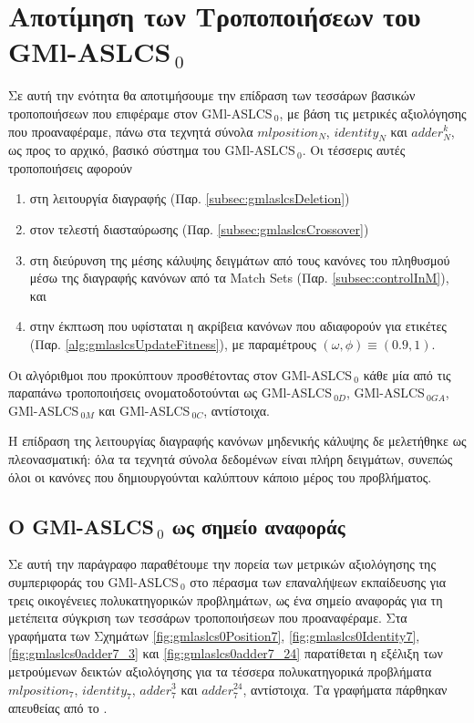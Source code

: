 \section{Αποτίμηση των Τροποποιήσεων του GMl-ASLCS$_{\:0}$}
Σε αυτή την ενότητα θα αποτιμήσουμε την επίδραση των τεσσάρων βασικών τροποποιήσεων που επιφέραμε στον GMl-ASLCS$_{\:0}$, με βάση τις μετρικές αξιολόγησης που προαναφέραμε, πάνω στα τεχνητά σύνολα $mlposition_{N}$, $identity_{N}$ και $adder^{k}_{N}$, ως προς το αρχικό, βασικό σύστημα του GMl-ASLCS$_{\:0}$. Οι τέσσερις αυτές τροποποιήσεις αφορούν 
\begin{enumerate}
\item στη λειτουργία διαγραφής (Παρ. \ref{subsec:gmlaslcsDeletion})
\item στον τελεστή διασταύρωσης (Παρ. \ref{subsec:gmlaslcsCrossover})
\item στη διεύρυνση της μέσης κάλυψης δειγμάτων από τους κανόνες του πληθυσμού μέσω της διαγραφής κανόνων από τα Match Sets (Παρ. \ref{subsec:controlInM}), και
\item στην έκπτωση που υφίσταται η ακρίβεια κανόνων που αδιαφορούν για ετικέτες (Παρ. \ref{alg:gmlaslcsUpdateFitness}), με παραμέτρους $(\omega, \phi) \equiv (0.9, 1)$.
\end{enumerate}

Οι αλγόριθμοι που προκύπτουν προσθέτοντας στον GMl-ASLCS$_{\:0}$ κάθε μία από τις παραπάνω τροποποιήσεις ονοματοδοτούνται ως GMl-ASLCS$_{\:0D}$, GMl-ASLCS$_{\:0GA}$, GMl-ASLCS$_{\:0M}$ και GMl-ASLCS$_{\:0C}$, αντίστοιχα. 

Η επίδραση της λειτουργίας διαγραφής κανόνων μηδενικής κάλυψης δε μελετήθηκε ως πλεονασματική: όλα τα τεχνητά σύνολα δεδομένων είναι πλήρη δειγμάτων, συνεπώς όλοι οι κανόνες που δημιουργούνται καλύπτουν κάποιο μέρος του προβλήματος.

\subsection{Ο GMl-ASLCS$_{\:0}$ ως σημείο αναφοράς}
Σε αυτή την παράγραφο παραθέτουμε την πορεία των μετρικών αξιολόγησης της συμπεριφοράς του GMl-ASLCS$_{\:0}$ στο πέρασμα των επαναλήψεων εκπαίδευσης για τρεις οικογένειες πολυκατηγορικών προβλημάτων, ως ένα σημείο αναφοράς για τη μετέπειτα σύγκριση των τεσσάρων τροποποιήσεων που προαναφέραμε. Στα γραφήματα των Σχημάτων \ref{fig:gmlaslcs0Position7}, \ref{fig:gmlaslcs0Identity7}, \ref{fig:gmlaslcs0adder7_3} και \ref{fig:gmlaslcs0adder7_24} παρατίθεται η εξέλιξη των μετρούμενων δεικτών αξιολόγησης για τα τέσσερα πολυκατηγορικά προβλήματα $mlposition_{7}$, $identity_{7}$, $adder^{3}_{7}$ και $adder^{24}_{7}$, αντίστοιχα. Τα γραφήματα πάρθηκαν απευθείας από το \cite{allamanis11}.


